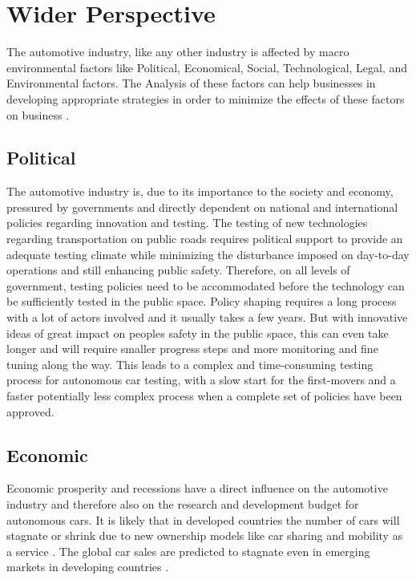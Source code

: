\documentclass[a4paper]{article}
\begin{document}
\section{Wider Perspective}
\label{sec:selecting}

The automotive industry, like any other industry is affected by macro environmental factors like Political, Economical, Social, Technological, Legal, and Environmental factors. The Analysis of these factors can help businesses in developing appropriate strategies in order to minimize the effects of these factors on business \cite{CAMPBELL2005123}.

\subsection{Political}
\label{sec:political}
The automotive industry is, due to its importance to the society and economy, pressured by governments and directly dependent on national and international policies regarding innovation and testing. The testing of new technologies regarding transportation on public roads requires political support to provide an adequate testing climate while minimizing the disturbance imposed on day-to-day operations and still enhancing public safety. Therefore, on all levels of government, testing policies need to be accommodated before the technology can be sufficiently tested in the public space. Policy shaping requires a long process with a lot of actors involved and it usually takes a few years. But with innovative ideas of great impact on peoples safety in the public space, this can even take longer and will require smaller progress steps and more monitoring and fine tuning along the way. This leads to a complex and time-consuming testing process for autonomous car testing, with a slow start for the first-movers and a faster potentially less complex process when a complete set of policies have been approved.

\subsection{Economic}
\label{sec:economic}
Economic prosperity and recessions have a direct influence on the automotive industry and therefore also on the research and development budget for autonomous cars. It is likely that in developed countries the number of cars will stagnate or shrink due to new ownership models like car sharing and mobility as a service \cite{Sivak2008}. The global car sales are predicted to stagnate even in emerging markets in developing countries \cite{Sivak2008}.
\end{document}
